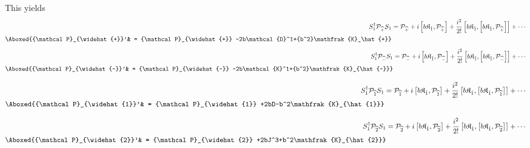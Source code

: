 \documentclass[]{article}
\numberwithin{equation}{section}
\def\wh{\widehat}
\begin{document}
{{%
This yields
\begin{align}
S_1^{\dagger} {\mathcal P}_{\wh{+}}S_1 & = {\mathcal P}_{\wh{+}} + i\left[b\mathfrak{K}_{\hat{1}}, {\mathcal P}_{\wh{+}} \right] + \frac{i^2}{2!}\left[b\mathfrak{K}_{\hat{1}}, \left[b\mathfrak{K}_{\hat{1}}, {\mathcal P}_{\wh{+}} \right]\right] + \cdots \\ %
\Aboxed{{\mathcal P}_{\wh{+}}'& = {\mathcal P}_{\wh{+}} -2b\mathcal{D}^1+{b^2}\mathfrak{K}_\hat{+}} 
\end{align}
\begin{align}
S_1^{\dagger} {\mathcal P}_{\wh{-}}S_1 & = {\mathcal P}_{\wh{-}} + i\left[b\mathfrak{K}_{\hat{1}}, {\mathcal P}_{\wh{-}} \right] + \frac{i^2}{2!}\left[b\mathfrak{K}_{\hat{1}}, \left[b\mathfrak{K}_{\hat{1}}, {\mathcal P}_{\wh{-}} \right]\right] + \cdots \\ %
\Aboxed{{\mathcal P}_{\wh{-}}'& = {\mathcal P}_{\wh{-}} -2b\mathcal{K}^1+{b^2}\mathfrak{K}_{\hat{-}}} 
\end{align}

\begin{align}
S_1^{\dagger} {\mathcal P}_{\wh{1}}S_1 & = {\mathcal P}_{\wh{1}} + i\left[b\mathfrak{K}_{\hat{1}}, {\mathcal P}_{\wh{1}} \right] + \frac{i^2}{2!}\left[b\mathfrak{K}_{\hat{1}}, \left[b\mathfrak{K}_{\hat{1}}, {\mathcal P}_{\wh{1}} \right]\right] + \cdots \\ %
\Aboxed{{\mathcal P}_{\wh{1}}'& = {\mathcal P}_{\wh{1}} +2bD-b^2\mathfrak{K}_{\hat{1}}} 
\end{align}


\begin{align}
S_1^{\dagger} {\mathcal P}_{\wh{2}}S_1 & = {\mathcal P}_{\wh{2}} + i\left[b\mathfrak{K}_{\hat{1}}, {\mathcal P}_{\wh{2}} \right] + \frac{i^2}{2!}\left[b\mathfrak{K}_{\hat{1}}, \left[b\mathfrak{K}_{\hat{1}}, {\mathcal P}_{\wh{2}} \right]\right] + \cdots \\ %
\Aboxed{{\mathcal P}_{\wh{2}}'& = {\mathcal P}_{\wh{2}} +2bJ^3+b^2\mathfrak{K}_{\hat{2}}} 
\end{align}

}}
\end{document}
